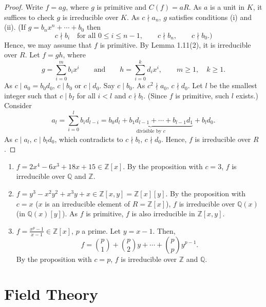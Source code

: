 \documentclass[twoside]{article}
\newcommand\Z{\mathbb Z}
\newcommand\Q{\mathbb Q}
\theoremstyle{remark}
\begin{document}
\begin{proof}
  Write \(f = ag\), where \(g\) is primitive and \(C(f) = aR\). As \(a\) is a unit in \(K\), it suffices to check \(g\) is irreducible over \(K\). As \(c \nmid a_n\), \(g\) satisfies conditions (i) and (ii). (If \(g = b_n x^n + \cdots + b_0\) then
  \[ c \nmid b_i \quad \text{for all \(0 \leq i \leq n-1\)}, \qquad c \nmid b_n, \qquad c \nmid b_0.) \]
  Hence, we may assume that \(f\) is primitive. By Lemma 1.11(2), it is irreducible over \(R\). Let \(f = gh\), where
  \[ g = \sum_{i=0}^m b_i x^i \qquad \text{and} \qquad h = \sum_{i=0}^k d_i x^i, \qquad m \geq 1, \quad k \geq 1. \]
  As \(c \mid a_0 = b_0 d_0\), \(c \mid b_0\) or \(c \mid d_0\). Say \(c \mid b_0\). As \(c^2 \nmid a_0\), \(c \nmid d_0\). Let \(l\) be the smallest integer such that \(c \mid b_I\) for all \(i < l\) and \(c \nmid b_l\). (Since \(f\) is primitive, such \(l\) exists.) Consider
  \[ a_l = \sum_{i=0}^l b_i d_{l-i} = \underbrace{b_0 d_l + b_1 d_{l-1} + \cdots + b_{l-1} d_1}_{\text{divisible by \(c\)}} + b_l d_0. \]
  As \(c \mid a_l\), \(c \mid b_l d_0\), which contradicts to \(c \nmid b_l\), \(c \nmid d_0\). Hence, \(f\) is irreducible over \(R\).
\end{proof}

\begin{examples}
  \begin{enumerate}[label=\arabic*.]
    \item \(f = 2x^4 - 6x^3 + 18x + 15 \in \Z[x]\). By the proposition with \(c = 3\), \(f\) is irreducible over \(\Q\) and \(\Z\).
    \item \(f = y^3 - x^2y^2 + x^3y + x \in \Z[x,y] = \Z[x][y]\). By the proposition with \(c = x\) (\(x\) is an irreducible element of \(R = \Z[x]\)), \(f\) is irreducible over \(\Q(x)\) (in \(\Q(x)[y]\)). As \(f\) is primitive, \(f\) is also irreducible in \(\Z[x,y]\).
    \item \(f = \frac{x^p-1}{x-1} \in \Z[x]\), \(p\) a prime. Let \(y = x-1\). Then,
    \[ f = \binom p1 + \binom p2 y + \cdots + \binom pp y^{p-1}. \]
    By the proposition with \(c=p\), \(f\) is irreducible over \(\Z\) and \(\Q\).
  \end{enumerate}
\end{examples}


\clearpage

\part{Field Theory}
\end{document}
